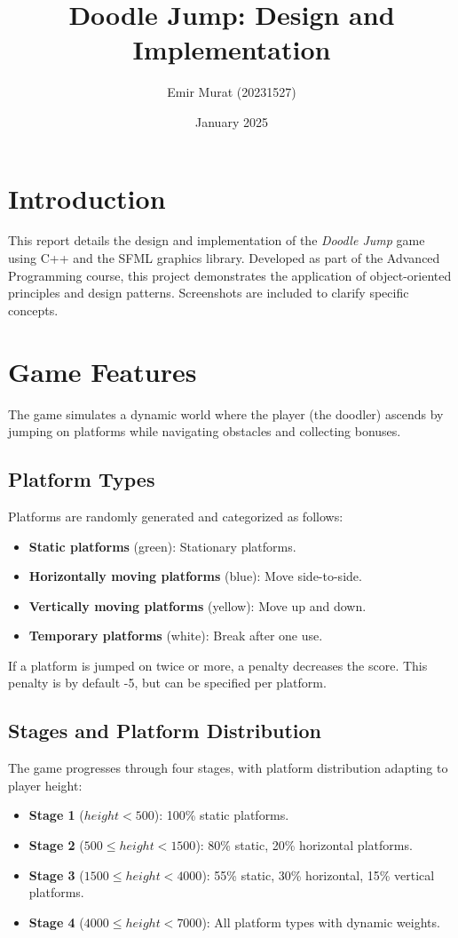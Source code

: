 \documentclass{article}
\title{Doodle Jump: Design and Implementation}
\author{Emir Murat (20231527)}
\date{January 2025}
\begin{document}
\maketitle

\section*{Introduction}
This report details the design and implementation of the \textit{Doodle Jump} game using C++ and the SFML graphics library. Developed as part of the Advanced Programming course, this project demonstrates the application of object-oriented principles and design patterns. Screenshots are included to clarify specific concepts.

\section*{Game Features}
The game simulates a dynamic world where the player (the doodler) ascends by jumping on platforms while navigating obstacles and collecting bonuses.

\subsection*{Platform Types}
Platforms are randomly generated and categorized as follows:
\begin{itemize}
    \item \textbf{Static platforms} (green): Stationary platforms.
    \item \textbf{Horizontally moving platforms} (blue): Move side-to-side.
    \item \textbf{Vertically moving platforms} (yellow): Move up and down.
    \item \textbf{Temporary platforms} (white): Break after one use.
\end{itemize}
If a platform is jumped on twice or more, a penalty decreases the score. This penalty is by default -5, but can be specified per platform.

\subsection*{Stages and Platform Distribution}
The game progresses through four stages, with platform distribution adapting to player height:
\begin{itemize}
    \item \textbf{Stage 1} ($height < 500$): 100\% static platforms.
    \item \textbf{Stage 2} ($500 \leq height < 1500$): 80\% static, 20\% horizontal platforms.
    \item \textbf{Stage 3} ($1500 \leq height < 4000$): 55\% static, 30\% horizontal, 15\% vertical platforms.
    \item \textbf{Stage 4} ($4000 \leq height < 7000$): All platform types with dynamic weights.
\end{itemize}
\end{document}
